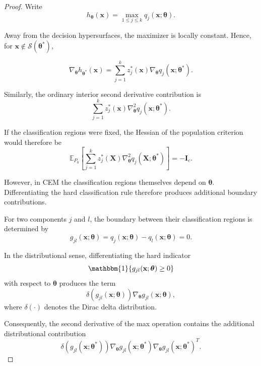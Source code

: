 \documentclass[pdflatex,sn-mathphys-ay]{sn-jnl}%
\let\oldtheta\theta
\renewcommand{\theta}{\boldsymbol{\oldtheta}}
\theoremstyle{thmstyleone}%
\theoremstyle{thmstyletwo}%
\theoremstyle{thmstylethree}%
\begin{document}
\begin{proof}

Write
\[
    h_{\boldsymbol{\theta}}(\mathbf{x})
    =
    \max_{1\leq j\leq k}
    q_j(\mathbf{x};\boldsymbol{\theta}).
\]

Away from the decision hypersurfaces, the maximizer is locally constant. Hence, for $\mathbf{x}
    \notin
    \mathcal{S}(\boldsymbol{\theta}^*)$,

\[
    \nabla_{\boldsymbol{\theta}}
    h_{\boldsymbol{\theta}^*}
    (\mathbf{x})
    =
    \sum_{j=1}^k
    z_j^*(\mathbf{x})
    \nabla_{\boldsymbol{\theta}}
    q_j(\mathbf{x};\boldsymbol{\theta}^*).
\]

Similarly, the ordinary interior second derivative contribution is
\[
    \sum_{j=1}^k
    z_j^*(\mathbf{x})
    \nabla_{\boldsymbol{\theta}}^2
    q_j(\mathbf{x};\boldsymbol{\theta}^*).
\]

If the classification regions were fixed, the Hessian of the population criterion would therefore be
\[
    \mathbb{E}_{P_0}
    \left[
        \sum_{j=1}^k
        z_j^*(\mathbf{X})
        \nabla_{\boldsymbol{\theta}}^2
        q_j(\mathbf{X};\boldsymbol{\theta}^*)
    \right]
    =
    -\mathbf{I}_c.
\]

However, in CEM the classification regions themselves depend on $\boldsymbol{\theta}$. Differentiating the hard classification rule therefore produces additional boundary contributions.

For two components $j$ and $l$, the boundary between their classification regions is determined by
\[
    g_{jl}
    (\mathbf{x};\boldsymbol{\theta})
    =
    q_j
    (\mathbf{x};\boldsymbol{\theta})
    -
    q_l
    (\mathbf{x};\boldsymbol{\theta})
    =
    0.
\]

In the distributional sense, differentiating the hard indicator
\[
    \mathbbm{1}
    \{
        g_{jl}
        (\mathbf{x};\boldsymbol{\theta})
        \geq
        0
    \}
\]
with respect to $\boldsymbol{\theta}$ produces the term
\[
    \delta
    \left(
        g_{jl}
        (\mathbf{x};\boldsymbol{\theta})
    \right)
    \nabla_{\boldsymbol{\theta}}
    g_{jl}
    (\mathbf{x};\boldsymbol{\theta}),
\]
where $\delta(\cdot)$ denotes the Dirac delta distribution.

Consequently, the second derivative of the max operation contains the additional distributional contribution
\[
    \delta
    \left(
        g_{jl}
        (\mathbf{x};\boldsymbol{\theta}^*)
    \right)
    \nabla_{\boldsymbol{\theta}}
    g_{jl}
    (\mathbf{x};\boldsymbol{\theta}^*)
    \nabla_{\boldsymbol{\theta}}
    g_{jl}
    (\mathbf{x};\boldsymbol{\theta}^*)^T.
\]


\end{proof}
\end{document}
